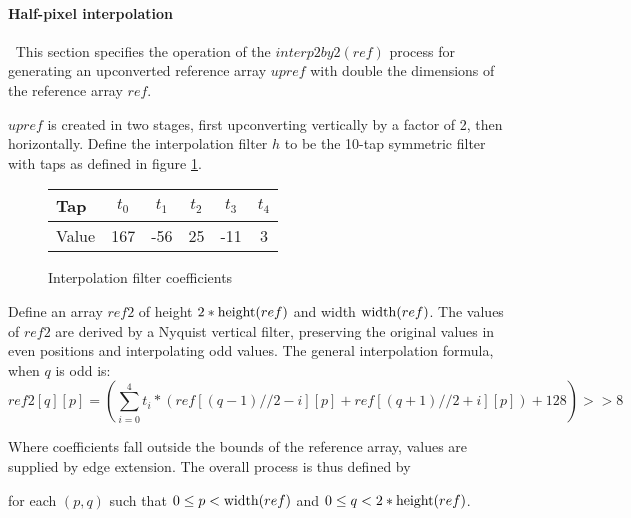 \paragraph{Half-pixel interpolation}
\label{halfpel}
$\ $\newline
This section specifies the operation of the $interp2by2(ref)$ process for generating
an upconverted reference array $upref$ with double the dimensions of the reference
array $ref$. 

$upref$ is created in two stages, first upconverting vertically by
a factor of 2, then horizontally. Define the interpolation filter $h$
to be the 10-tap symmetric filter with taps as defined in figure \ref{upfilter}.

\begin{figure}[h!]
\begin{centering}
\begin{tabular}{l|ccccc}
Tap & $t_0$ & $t_1$ & $t_2$ & $t_3$ & $t_4$\\
\hline
Value & 167 & -56 & 25 & -11 & 3
\end{tabular}
\caption{Interpolation filter coefficients \label{upfilter}}
\end{centering}
\end{figure}

Define an array $ref2$ of height $2*\operatorname{height}(ref)$ and width $\operatorname{width}(ref)$.
The values of $ref2$ are derived by a Nyquist vertical filter, preserving
the original values in even positions and interpolating odd values. The general 
interpolation formula, when $q$ is odd is:
\[
ref2[q][p]=  \left(\sum_{i=0}^{4} t_i *
\left(
 ref[(q-1)//2-i][p]
+ref[(q+1)//2+i][p]
\right)+128 \right)>>8
\]

Where coefficients fall outside the bounds of the reference array, values
are supplied by edge extension. The overall process is thus defined by

\begin{pseudo*}
\bsELSE
{}
\bsEND
{}
\end{pseudo*}

for each $(p,q)$ such that $0\leq p<\operatorname{width}(ref)$ and $0\leq q<2*\operatorname{height}(ref)$.

